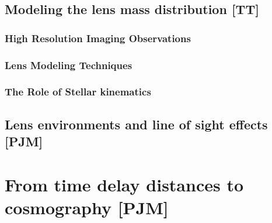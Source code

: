 \subsection{Modeling the lens mass distribution [TT]}
\label{sec:lensmodel}



\subsubsection{High Resolution Imaging Observations}





\subsubsection{Lens Modeling Techniques}




\subsubsection{The Role of Stellar kinematics}



\subsection{Lens environments and line of sight effects [PJM]}
\label{sec:los}





\section{From time delay distances to cosmography [PJM]}
\label{sec:cosmo}

